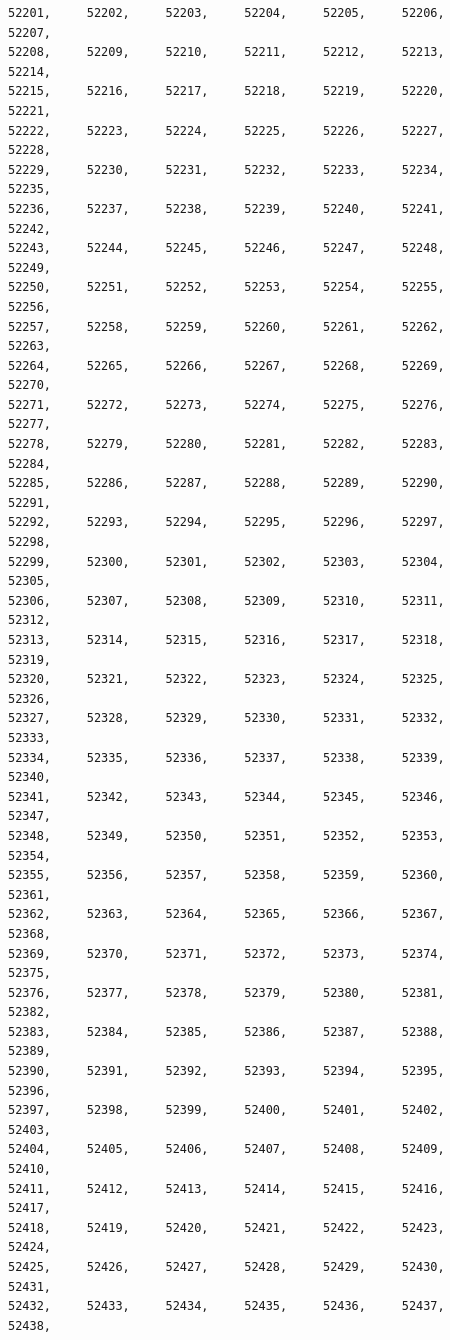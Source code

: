 \documentclass[a4paper,11pt]{report}
\begin{document}
\begin{verbatim}
52201,     52202,     52203,     52204,     52205,     52206,     52207,     
52208,     52209,     52210,     52211,     52212,     52213,     52214,     
52215,     52216,     52217,     52218,     52219,     52220,     52221,     
52222,     52223,     52224,     52225,     52226,     52227,     52228,     
52229,     52230,     52231,     52232,     52233,     52234,     52235,     
52236,     52237,     52238,     52239,     52240,     52241,     52242,     
52243,     52244,     52245,     52246,     52247,     52248,     52249,     
52250,     52251,     52252,     52253,     52254,     52255,     52256,     
52257,     52258,     52259,     52260,     52261,     52262,     52263,     
52264,     52265,     52266,     52267,     52268,     52269,     52270,     
52271,     52272,     52273,     52274,     52275,     52276,     52277,     
52278,     52279,     52280,     52281,     52282,     52283,     52284,     
52285,     52286,     52287,     52288,     52289,     52290,     52291,     
52292,     52293,     52294,     52295,     52296,     52297,     52298,     
52299,     52300,     52301,     52302,     52303,     52304,     52305,     
52306,     52307,     52308,     52309,     52310,     52311,     52312,     
52313,     52314,     52315,     52316,     52317,     52318,     52319,     
52320,     52321,     52322,     52323,     52324,     52325,     52326,     
52327,     52328,     52329,     52330,     52331,     52332,     52333,     
52334,     52335,     52336,     52337,     52338,     52339,     52340,     
52341,     52342,     52343,     52344,     52345,     52346,     52347,     
52348,     52349,     52350,     52351,     52352,     52353,     52354,     
52355,     52356,     52357,     52358,     52359,     52360,     52361,     
52362,     52363,     52364,     52365,     52366,     52367,     52368,     
52369,     52370,     52371,     52372,     52373,     52374,     52375,     
52376,     52377,     52378,     52379,     52380,     52381,     52382,     
52383,     52384,     52385,     52386,     52387,     52388,     52389,     
52390,     52391,     52392,     52393,     52394,     52395,     52396,     
52397,     52398,     52399,     52400,     52401,     52402,     52403,     
52404,     52405,     52406,     52407,     52408,     52409,     52410,     
52411,     52412,     52413,     52414,     52415,     52416,     52417,     
52418,     52419,     52420,     52421,     52422,     52423,     52424,     
52425,     52426,     52427,     52428,     52429,     52430,     52431,     
52432,     52433,     52434,     52435,     52436,     52437,     52438,     

\end{verbatim}
\end{document}
